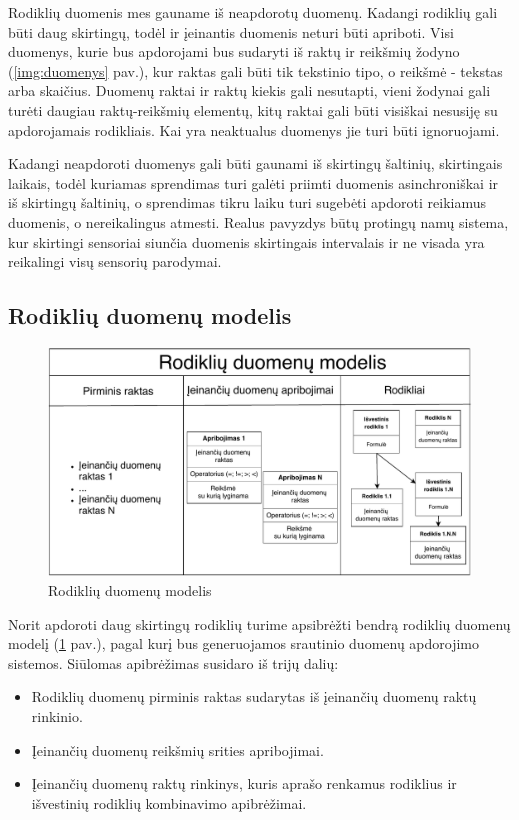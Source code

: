 \documentclass{VUMIFPSbakalaurinis}
\begin{document}
Rodiklių duomenis mes gauname iš neapdorotų duomenų. Kadangi rodiklių gali būti daug skirtingų, todėl ir įeinantis duomenis neturi būti apriboti. Visi duomenys, kurie bus apdorojami bus sudaryti iš raktų ir reikšmių žodyno (\ref{img:duomenys} pav.), kur raktas gali būti tik tekstinio tipo, o reikšmė - tekstas arba skaičius. Duomenų raktai ir raktų kiekis gali nesutapti, vieni žodynai gali turėti daugiau raktų-reikšmių elementų, kitų raktai gali būti visiškai nesusiję su apdorojamais rodikliais. Kai yra neaktualus duomenys jie turi būti ignoruojami.\par 
Kadangi neapdoroti duomenys gali būti gaunami iš skirtingų šaltinių, skirtingais laikais, todėl kuriamas sprendimas turi galėti priimti duomenis asinchroniškai ir iš skirtingų šaltinių, o sprendimas tikru laiku turi sugebėti apdoroti reikiamus duomenis, o nereikalingus atmesti. Realus pavyzdys būtų protingų namų sistema, kur skirtingi sensoriai siunčia duomenis skirtingais intervalais ir ne visada yra reikalingi visų sensorių parodymai.  

\subsection{Rodiklių duomenų modelis}

\begin{figure}[H]
    \includegraphics[width=1\textwidth]{img/rodiklio_modelis.pdf}
    \caption{Rodiklių duomenų modelis}
    \label{img:rodiklio_apibrezimas}
\end{figure}

Norit apdoroti daug skirtingų rodiklių turime apsibrėžti bendrą rodiklių duomenų modelį (\ref{img:rodiklio_apibrezimas} pav.), pagal kurį bus generuojamos srautinio duomenų apdorojimo sistemos. Siūlomas apibrėžimas susidaro iš trijų dalių: 
\begin{itemize}
    \item Rodiklių duomenų pirminis raktas sudarytas iš įeinančių duomenų raktų rinkinio.
    \item Įeinančių duomenų reikšmių srities apribojimai.
    \item Įeinančių duomenų raktų rinkinys, kuris aprašo renkamus rodiklius ir išvestinių rodiklių kombinavimo apibrėžimai. 
\end{itemize}
\end{document}
